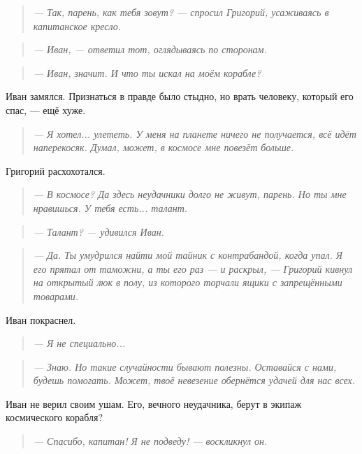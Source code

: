 \documentclass[12pt,a4paper]{book}
\newenvironment{dialogue}{\begin{quote}\itshape}{\end{quote}} %
\begin{document}
\begin{dialogue}
--- Так, парень, как тебя зовут? --- спросил Григорий, усаживаясь в капитанское кресло.
\end{dialogue}

\begin{dialogue}
--- Иван, --- ответил тот, оглядываясь по сторонам.
\end{dialogue}

\begin{dialogue}
--- Иван, значит. И что ты искал на моём корабле?
\end{dialogue}

Иван замялся. Признаться в правде было стыдно, но врать человеку, который его спас, --- ещё хуже.

\begin{dialogue}
--- Я хотел... улететь. У меня на планете ничего не получается, всё идёт наперекосяк. Думал, может, в космосе мне повезёт больше.
\end{dialogue}

Григорий расхохотался.

\begin{dialogue}
--- В космосе? Да здесь неудачники долго не живут, парень. Но ты мне нравишься. У тебя есть... талант.
\end{dialogue}

\begin{dialogue}
--- Талант? --- удивился Иван.
\end{dialogue}

\begin{dialogue}
--- Да. Ты умудрился найти мой тайник с контрабандой, когда упал. Я его прятал от таможни, а ты его раз --- и раскрыл, --- Григорий кивнул на открытый люк в полу, из которого торчали ящики с запрещёнными товарами.
\end{dialogue}

Иван покраснел.

\begin{dialogue}
--- Я не специально...
\end{dialogue}

\begin{dialogue}
--- Знаю. Но такие случайности бывают полезны. Оставайся с нами, будешь помогать. Может, твоё невезение обернётся удачей для нас всех.
\end{dialogue}

Иван не верил своим ушам. Его, вечного неудачника, берут в экипаж космического корабля?

\begin{dialogue}
--- Спасибо, капитан! Я не подведу! --- воскликнул он.
\end{dialogue}
\end{document}
